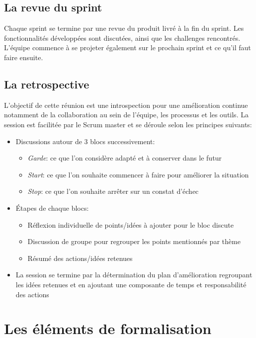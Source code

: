 \subsection{La revue du sprint}

Chaque sprint se termine par une revue du produit livré à la fin du sprint. Les fonctionnalités 
développées sont discutées, ainsi que les challenges rencontrés.
L'équipe commence à se projeter également sur le prochain sprint et ce qu’il faut faire ensuite.

\subsection{La retrospective}
L’objectif de cette réunion est une introspection pour une amélioration continue notamment de 
la collaboration au sein de l'équipe, les processus et les outils.
La session est facilitée par le Scrum master et se déroule selon les principes suivants:

\begin{itemize}
      \item Discussions autour de 3 blocs successivement:
      \begin{itemize}
            \item \emph{Garde}: ce que l’on considère adapté et à conserver dans le futur
            \item \emph{Start}: ce que l’on souhaite commencer à faire pour améliorer la situation
            \item \emph{Stop}: ce que l’on souhaite arrêter sur un constat d'échec
      \end{itemize}
      \item Étapes de chaque blocs:
      \begin{itemize}
            \item Réflexion individuelle de points/idées à ajouter pour le bloc discute
            \item Discussion de groupe pour regrouper les points mentionnés par thème
            \item Résumé des actions/idées retenues
      \end{itemize}
      \item La session se termine par la détermination du plan d'amélioration regroupant les 
      idées retenues et en ajoutant une composante de temps et responsabilité des actions
      
\end{itemize}

\section{Les éléments de formalisation}

